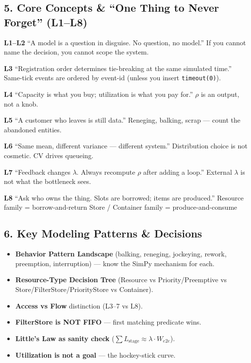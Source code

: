 \documentclass[11pt]{article}
\begin{document}
\subsection*{5. Core Concepts \& ``One Thing to Never Forget'' (L1--L8)}

\textbf{L1--L2}
``A model is a question in disguise. No question, no model.''  
If you cannot name the decision, you cannot scope the system.

\textbf{L3}
``Registration order determines tie-breaking at the same simulated time.''  
Same-tick events are ordered by event-id (unless you insert \texttt{timeout(0)}).

\textbf{L4}
``Capacity is what you buy; utilization is what you pay for.''  
$\rho$ is an output, not a knob.

\textbf{L5}
``A customer who leaves is still data.''  
Reneging, balking, scrap --- count the abandoned entities.

\textbf{L6}
``Same mean, different variance --- different system.''  
Distribution choice is not cosmetic. CV drives queueing.

\textbf{L7}
``Feedback changes $\lambda$. Always recompute $\rho$ after adding a loop.''  
External $\lambda$ is not what the bottleneck sees.

\textbf{L8}
``Ask who owns the thing. Slots are borrowed; items are produced.''  
Resource family = borrow-and-return  
Store / Container family = produce-and-consume

\subsection*{6. Key Modeling Patterns \& Decisions}
\begin{itemize}[leftmargin=*]
\item \textbf{Behavior Pattern Landscape} (balking, reneging, jockeying, rework, preemption, interruption) --- know the SimPy mechanism for each.
\item \textbf{Resource-Type Decision Tree} (Resource vs Priority/Preemptive vs Store/FilterStore/PriorityStore vs Container).
\item \textbf{Access vs Flow} distinction (L3--7 vs L8).
\item \textbf{FilterStore is NOT FIFO} --- first matching predicate wins.
\item \textbf{Little's Law as sanity check} ($\sum L_{\text{stage}} \approx \lambda \cdot W_{e2e}$).
\item \textbf{Utilization is not a goal} --- the hockey-stick curve.
\end{itemize}
\end{document}
